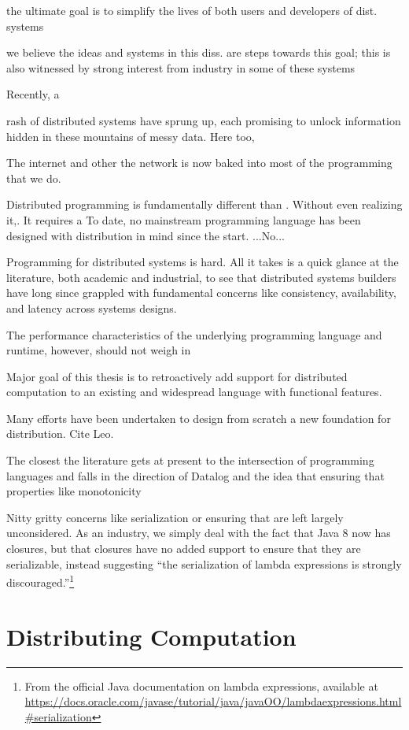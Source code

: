 the ultimate goal is to simplify the lives of both users and developers of dist.
systems

we believe the ideas and systems in this diss. are steps towards this goal; this
is also witnessed by strong interest from industry in some of these systems


 Recently, a

 rash of distributed systems have
sprung up, each promising to unlock information hidden in these mountains of
messy data. Here too,

The internet and other the network is
now baked into most of the programming that we do.


Distributed programming is fundamentally different than . Without even realizing
it,. It requires a
To date, no mainstream programming language has been designed with distribution in mind since the start. ...No...

Programming for distributed systems is hard. All it takes is a quick glance at
the literature, both academic and industrial, to see that distributed systems
builders have long since grappled with fundamental concerns like consistency,
availability, and latency across systems designs.

The performance characteristics of the underlying programming language and
runtime, however, should not weigh in

Major goal of this thesis is to retroactively add support for distributed
computation to an existing and widespread language with functional features.

Many efforts have been undertaken to design from scratch a new foundation for
distribution. Cite Leo.


The closest the literature gets at present to the intersection of programming
languages and falls in the direction of Datalog and the idea that ensuring that
properties like monotonicity

Nitty gritty concerns like serialization or ensuring that are left largely
unconsidered. As an industry, we simply deal with the fact that Java 8 now has
closures, but that closures have no added support to ensure that they are
serializable, instead suggesting ``the serialization of lambda expressions is
strongly discouraged.''\footnote{From the official Java documentation on lambda
expressions, available at
\url{https://docs.oracle.com/javase/tutorial/java/javaOO/lambdaexpressions.html\#serialization}}

\section{Distributing Computation}



